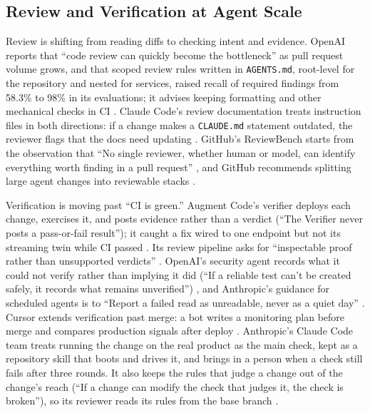 \documentclass[11pt]{article}
\begin{document}
\subsection{Review and Verification at Agent Scale}
Review is shifting from reading diffs to checking intent and evidence. OpenAI reports that ``code review can quickly become the bottleneck'' as pull request volume grows, and that scoped review rules written in \texttt{AGENTS.md}, root-level for the repository and nested for services, raised recall of required findings from 58.3\% to 98\% in its evaluations; it advises keeping formatting and other mechanical checks in CI \cite{srikanth2026reviewrules}. Claude Code's review documentation treats instruction files in both directions: if a change makes a \texttt{CLAUDE.md} statement outdated, the reviewer flags that the docs need updating \cite{anthropic2026codereview}. GitHub's ReviewBench starts from the observation that ``No single reviewer, whether human or model, can identify everything worth finding in a pull request'' \cite{zhou2026reviewbench}, and GitHub recommends splitting large agent changes into reviewable stacks \cite{muiruri2026stack}.

Verification is moving past ``CI is green.'' Augment Code's verifier deploys each change, exercises it, and posts evidence rather than a verdict (``The Verifier never posts a pass-or-fail result''); it caught a fix wired to one endpoint but not its streaming twin while CI passed \cite{custer2026verifier}. Its review pipeline asks for ``inspectable proof rather than unsupported verdicts'' \cite{utture2026prmerge}. OpenAI's security agent records what it could not verify rather than implying it did (``If a reliable test can't be created safely, it records what remains unverified'') \cite{aiello2026daybreak}, and Anthropic's guidance for scheduled agents is to ``Report a failed read as unreadable, never as a quiet day'' \cite{martin2026automations}. Cursor extends verification past merge: a bot writes a monitoring plan before merge and compares production signals after deploy \cite{lalkaka2026rollouts}. Anthropic's Claude Code team treats running the change on the real product as the main check, kept as a repository skill that boots and drives it, and brings in a person when a check still fails after three rounds. It also keeps the rules that judge a change out of the change's reach (``If a change can modify the check that judges it, the check is broken''), so its reviewer reads its rules from the base branch \cite{osmani2026verification}.
\end{document}
